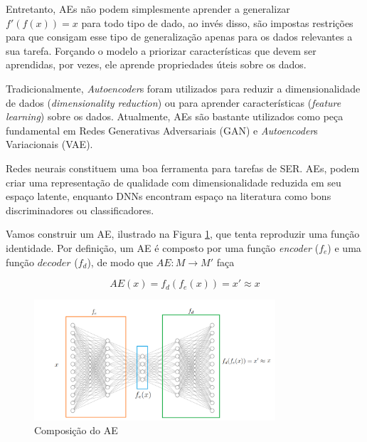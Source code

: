 Entretanto, \acrshort{AE}s não podem simplesmente aprender a generalizar $f'(f(x)) = x$ para todo tipo de dado, ao invés disso, são impostas restrições para que consigam esse tipo de generalização apenas para os dados relevantes a sua tarefa. Forçando o modelo a priorizar características que devem ser aprendidas, por vezes, ele aprende propriedades úteis sobre os dados.

Tradicionalmente, \textit{Autoencoder}s foram utilizados para reduzir a dimensionalidade de dados (\textit{dimensionality reduction}) ou para aprender características (\textit{feature learning}) sobre os dados. Atualmente, \acrshort{AE}s são bastante utilizados como peça fundamental em Redes Generativas Adversariais (\acrshort{GAN}) e \textit{Autoencoder}s Variacionais (\acrshort{VAE}).





Redes neurais constituem uma boa ferramenta para tarefas de \acrshort{SER}. \acrshort{AE}s, podem criar uma representação de qualidade com dimensionalidade reduzida em seu espaço latente, enquanto \acrshort{DNN}s encontram espaço na literatura como bons discriminadores ou classificadores.

Vamos construir um \acrshort{AE}, ilustrado na Figura \ref{fig:composicaoae}, que tenta reproduzir uma função identidade. Por definição, um \acrlong{AE} é composto por uma função \textit{encoder} ($f_e$) e uma função $decoder$ ($f_d$), de modo que $AE: M \rightarrow M'$ faça

\begin{equation}
    AE(x) = f_d(f_e(x)) = x' \approx x
\end{equation}

\begin{figure}[]
    \centering
    \includegraphics[width=0.8\textwidth]{img/p-autoencoder.png}
    \caption{\label{fig:composicaoae}Composição do \acrshort{AE}}
\end{figure}

